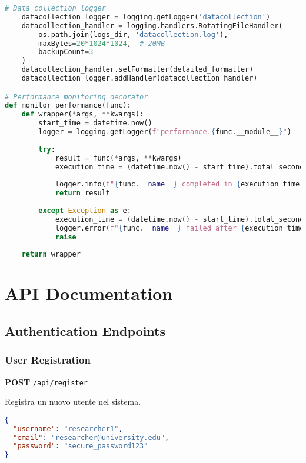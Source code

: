 \documentclass[12pt,a4paper]{report}
\begin{document}
\begin{lstlisting}[language=python, caption=Logging Configuration]
    # Data collection logger
    datacollection_logger = logging.getLogger('datacollection')
    datacollection_handler = logging.handlers.RotatingFileHandler(
        os.path.join(logs_dir, 'datacollection.log'),
        maxBytes=20*1024*1024,  # 20MB
        backupCount=3
    )
    datacollection_handler.setFormatter(detailed_formatter)
    datacollection_logger.addHandler(datacollection_handler)

# Performance monitoring decorator
def monitor_performance(func):
    def wrapper(*args, **kwargs):
        start_time = datetime.now()
        logger = logging.getLogger(f"performance.{func.__module__}")
        
        try:
            result = func(*args, **kwargs)
            execution_time = (datetime.now() - start_time).total_seconds()
            
            logger.info(f"{func.__name__} completed in {execution_time:.2f}s")
            return result
            
        except Exception as e:
            execution_time = (datetime.now() - start_time).total_seconds()
            logger.error(f"{func.__name__} failed after {execution_time:.2f}s: {str(e)}")
            raise
    
    return wrapper
\end{lstlisting}

\chapter{API Documentation}

\section{Authentication Endpoints}

\subsection{User Registration}

\textbf{POST} \texttt{/api/register}

Registra un nuovo utente nel sistema.

\begin{lstlisting}[language=json, caption=Request Body]
{
  "username": "researcher1",
  "email": "researcher@university.edu",
  "password": "secure_password123"
}
\end{lstlisting}
\end{document}
